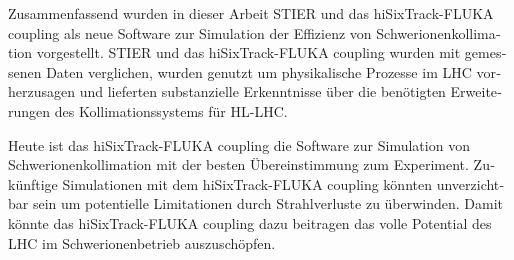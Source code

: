 \begin{otherlanguage}{german}



\thispagestyle{plain}

Zusammenfassend wurden in dieser Arbeit STIER und das hiSixTrack-FLUKA coupling als neue Software zur Simulation der Effizienz von Schwerionenkollimation vorgestellt. STIER und das hiSixTrack-FLUKA coupling wurden mit gemessenen Daten verglichen, wurden genutzt um physikalische Prozesse im LHC vorherzusagen und lieferten substanzielle Erkenntnisse \"{u}ber die ben\"{o}tigten Erweiterungen des Kollimationssystems f\"{u}r HL-LHC.  
\vspace{0.2cm}

Heute ist das hiSixTrack-FLUKA coupling die Software zur Simulation von Schwerionenkollimation mit der besten \"{U}bereinstimmung zum Experiment. Zuk\"{u}nftige Simulationen mit dem hiSixTrack-FLUKA coupling k\"{o}nnten unverzichtbar sein um potentielle Limitationen durch Strahlverluste zu \"{u}berwinden. Damit k\"{o}nnte das hiSixTrack-FLUKA coupling dazu beitragen das volle Potential des LHC im Schwerionenbetrieb auszusch\"{o}pfen. 

 

\end{otherlanguage}